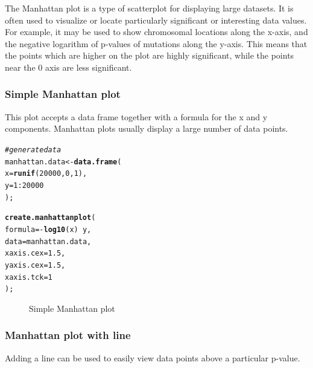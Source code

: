 \documentclass[letterpaper]{report}\usepackage[]{graphicx}\usepackage[]{color}
\makeatletter
\newcommand{\hlnum}[1]{\textcolor[rgb]{0.686,0.059,0.569}{#1}}%
\newcommand{\hlcom}[1]{\textcolor[rgb]{0.678,0.584,0.686}{\textit{#1}}}%
\newcommand{\hlopt}[1]{\textcolor[rgb]{0,0,0}{#1}}%
\newcommand{\hlstd}[1]{\textcolor[rgb]{0.345,0.345,0.345}{#1}}%
\newcommand{\hlkwb}[1]{\textcolor[rgb]{0.69,0.353,0.396}{#1}}%
\newcommand{\hlkwc}[1]{\textcolor[rgb]{0.333,0.667,0.333}{#1}}%
\newcommand{\hlkwd}[1]{\textcolor[rgb]{0.737,0.353,0.396}{\textbf{#1}}}%
\newenvironment{kframe}{%
 \def\at@end@of@kframe{}%
 \ifinner\ifhmode%
  \def\at@end@of@kframe{\end{minipage}}%
  \begin{minipage}{\columnwidth}%
 \fi\fi%
 \def\FrameCommand##1{\hskip\@totalleftmargin \hskip-\fboxsep
 \colorbox{shadecolor}{##1}\hskip-\fboxsep
     \hskip-\linewidth \hskip-\@totalleftmargin \hskip\columnwidth}%
 \MakeFramed {\advance\hsize-\width
   \@totalleftmargin\z@ \linewidth\hsize
   \@setminipage}}%
 {\par\unskip\endMakeFramed%
 \at@end@of@kframe}
\newenvironment{knitrout}{}{} %
\makeatother
\begin{document}
The Manhattan plot is a type of scatterplot for displaying large datasets. It is often used to visualize or locate particularly significant or interesting data values. For example, it may be used to show chromosomal locations along the x-axis, and the negative logarithm of p-values of mutations along the y-axis. This means that the points which are higher on the plot are highly significant, while the points near the 0 axis are less significant.

\subsubsection{Simple Manhattan plot}
This plot accepts a data frame together with a formula for the x and y components. Manhattan plots usually display a large number of data points.

\begin{knitrout}
\color{fgcolor}\begin{kframe}
\begin{alltt}
\hlcom{# generate data}
\hlstd{manhattan.data} \hlkwb{<-} \hlkwd{data.frame}\hlstd{(}
    \hlkwc{x} \hlstd{=} \hlkwd{runif}\hlstd{(}\hlnum{20000}\hlstd{,} \hlnum{0}\hlstd{,} \hlnum{1}\hlstd{),}
    \hlkwc{y} \hlstd{=} \hlnum{1}\hlopt{:}\hlnum{20000}
    \hlstd{);}

\hlkwd{create.manhattanplot}\hlstd{(}
    \hlkwc{formula} \hlstd{=} \hlopt{-}\hlkwd{log10}\hlstd{(x)} \hlopt{~} \hlstd{y,}
    \hlkwc{data} \hlstd{= manhattan.data,}
    \hlkwc{xaxis.cex} \hlstd{=} \hlnum{1.5}\hlstd{,}
    \hlkwc{yaxis.cex} \hlstd{=} \hlnum{1.5}     \hlstd{,}
    \hlkwc{xaxis.tck} \hlstd{=} \hlnum{1}
    \hlstd{);}
\end{alltt}
\end{kframe}\begin{figure}

{\centering {} 

}

\caption[Simple Manhattan plot]{Simple Manhattan plot}\label{fig:manhattan1}
\end{figure}


\end{knitrout}

\subsubsection{Manhattan plot with line}
Adding a line can be used to easily view data points above a particular p-value.
\end{document}
